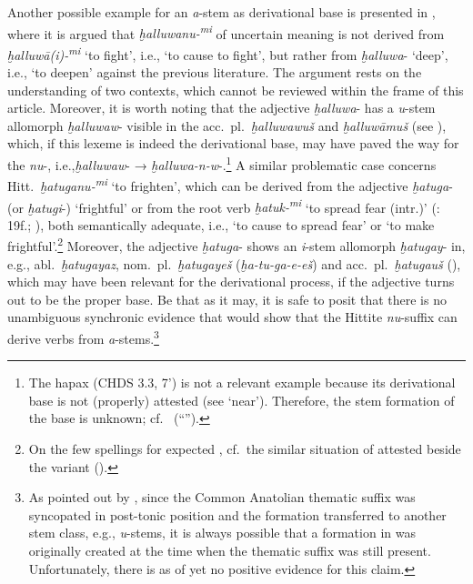 \documentclass[output=paper,colorlinks,citecolor=brown]{langscibook}
\begin{document}
Another possible example for an \textit{a}-stem as derivational base is presented in , where it is argued that \textit{ḫalluwanu-\textsuperscript{mi}} of uncertain meaning is not derived from \textit{ḫalluwā(i)-\textsuperscript{mi}} ‘to fight’, i.e., ‘to cause to fight’, but rather from \mbox{\textit{ḫalluwa}-} ‘deep’, i.e., ‘to deepen’ against the previous literature. The argument rests on the understanding of two contexts, which cannot be reviewed within the frame of this article. Moreover, it is worth noting that the adjective \mbox{\textit{ḫalluwa}-} has a \textit{u}-stem allomorph \textit{ḫalluwaw}- visible in the acc.\ pl.\ \mbox{\textit{ḫalluwawuš}} and \mbox{\textit{ḫalluwāmuš}} (see ), which, if this lexeme is indeed the derivational base, may have paved the way for the \textit{nu}-, i.e.,\textit{ḫalluwaw}- → \textit{ḫalluwa-n-w}-.\footnote{The hapax  (CHDS 3.3, 7') is not a relevant example because its derivational base is not (properly) attested (see   ‘near’). Therefore, the stem formation of the base is unknown; cf.\ \citealt[246]{Oettinger1979} (“”).} A similar problematic case concerns Hitt.\ \textit{ḫatuganu-\textsuperscript{mi}} ‘to frighten’, which can be derived from the adjective \textit{ḫatuga}- (or \textit{ḫatugi}-) ‘frightful’ \citep[155]{Luraghi1992} or from the root verb \textit{ḫatuk-\textsuperscript{mi}} ‘to spread fear (intr.)’ (\citealt{Koch1973}: 19f.; ), both semantically adequate, i.e., ‘to cause to spread fear’ or ‘to make frightful’.\footnote{On the few spellings  for expected , cf.\ the similar situation of  attested beside the variant  (\citealt[1027--1028]{Kloekhorst2008}).} Moreover, the adjective \textit{ḫatuga}- shows an \textit{i}-stem allomorph \textit{ḫatugay}- in, e.g., abl.\ \mbox{\textit{ḫatugayaz},} nom.\ pl.\ \textit{ḫatugayeš} (\textit{ḫa-tu-ga-e-eš}) and acc.\ pl.\ \textit{ḫatugauš} (), which may have been relevant for the derivational process, if the adjective turns out to be the proper base. Be that as it may, it is safe to posit that there is no unambiguous  synchronic evidence that would show that the Hittite  \textit{nu}-suffix can derive verbs from \textit{a}-stems.\footnote{As pointed out by \citet[483]{Sasseville2021}, since the Common Anatolian thematic suffix  was syncopated in post-tonic position and the formation transferred to another stem class, e.g., \textit{u}-stems, it is always possible that a formation in  was originally created at the time when the thematic suffix was still present. Unfortunately, there is as of yet no positive evidence for this claim.}
\end{document}
